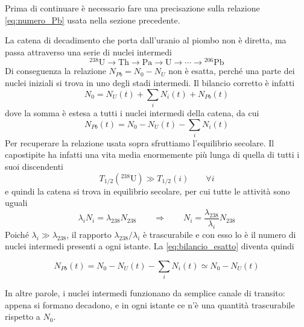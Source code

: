 Prima di continuare è necessario fare una precisazione sulla relazione \eqref{eq:numero_Pb} usata nella sezione precedente. 

La catena di decadimento che porta dall'uranio al piombo non è diretta, ma passa attraverso una serie di nuclei intermedi 
%
\begin{equation*}
    {}^{238}\mathrm{U} \longrightarrow \mathrm{Th} \longrightarrow \mathrm{Pa} \longrightarrow \mathrm{U} \longrightarrow \cdots \longrightarrow {}^{206}\mathrm{Pb}
\end{equation*}
Di conseguenza la relazione $N_{Pb} = N_0 - N_U$ non è esatta, perché una parte dei nuclei iniziali si trova in uno degli stadi intermedi. Il bilancio corretto è infatti
%
\begin{equation*}
    N_0 = N_{U}(t) + \sum_i N_i(t) + N_{Pb}(t)
\end{equation*}
dove la somma è estesa a tutti i nuclei intermedi della catena, da cui
%
\begin{equation}
    N_{Pb}(t) = N_0 - N_{U}(t) - \sum_i N_i(t)
    \label{eq:bilancio_esatto}
\end{equation}
Per recuperare la relazione usata sopra sfruttiamo l'equilibrio secolare. Il capostipite ha infatti una vita media enormemente più lunga di quella di tutti i suoi discendenti
%
\begin{equation*}
    T_{1/2}({}^{238}\mathrm{U}) \gg T_{1/2}(i) \qquad \forall i
\end{equation*}
e quindi la catena si trova in equilibrio secolare, per cui tutte le attività sono uguali
%
\begin{equation*}
    \lambda_i N_i = \lambda_{238} N_{238} \qquad \Longrightarrow \qquad N_i = \frac{\lambda_{238}}{\lambda_i} N_{238}
\end{equation*}
Poiché $\lambda_i \gg \lambda_{238}$, il rapporto $\lambda_{238}/\lambda_i$ è trascurabile e con esso lo è il numero di nuclei intermedi presenti a ogni istante. La \eqref{eq:bilancio_esatto} diventa quindi 
%
\begin{tcolorbox}[colback=black!5!white, colframe=black!45!white, boxrule=0.8pt]
\begin{equation}
    N_{Pb}(t) = N_0 - N_{U}(t) - \sum_i N_i(t) \simeq N_0 - N_U(t)
\end{equation}
\end{tcolorbox}
In altre parole, i nuclei intermedi funzionano da semplice canale di transito: appena si formano decadono, e in ogni istante ce n'è una quantità trascurabile rispetto a $N_0$.

